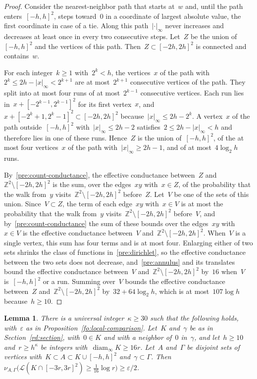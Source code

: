 \documentclass[11pt]{amsart}
\numberwithin{equation}{section}
\newtheorem{lemma}[equation]{Lemma}
\newcommand{\Z}{\mathbb Z}
\newcommand{\cL}{\mathscr{L}}
\DeclareMathOperator{\diam}{diam}
\begin{document}
\begin{proof}
Consider the nearest-neighbor path that starts at~$w$ and, until the path enters~$[-h,h]^2$, steps toward~$0$ in a coordinate of largest absolute value, the first coordinate in case of a tie. Along this path~$|\cdot|_\infty$ never increases and decreases at least once in every two consecutive steps. Let~$Z$ be the union of~$[-h,h]^2$ and the vertices of this path. Then~$Z\subset [-2h,2h]^2$ is connected and contains~$w$.

For each integer~$k\geq1$ with~$2^k<h$, the vertices~$x$ of the path with~$2^k\leq2h-|x|_\infty<2^{k+1}$ are at most~$2^{k+1}$ consecutive vertices of the path. They split into at most four runs of at most~$2^{k-1}$ consecutive vertices. Each run lies in~$x+[-2^{k-1},2^{k-1}]^2$ for its first vertex~$x$, and~$x+[-2^k+1,2^k-1]^2\subset [-2h,2h]^2$ because~$|x|_\infty\leq2h-2^k$. A vertex~$x$ of the path outside~$[-h,h]^2$ with~$|x|_\infty\leq2h-2$ satisfies~$2\leq2h-|x|_\infty<h$ and therefore lies in one of these runs. Hence~$Z$ is the union of~$[-h,h]^2$, of the at most four vertices~$x$ of the path with~$|x|_\infty\geq2h-1$, and of at most~$4\log_2h$ runs.

By~\eqref{pre:count-conductance}, the effective conductance between~$Z$ and~$\Z^2\setminus [-2h,2h]^2$ is the sum, over the edges~$xy$ with~$x\in Z$, of the probability that the walk from~$y$ visits~$\Z^2\setminus [-2h,2h]^2$ before~$Z$. Let~$V$ be one of the sets of this union. Since~$V\subset Z$, the term of each edge~$xy$ with~$x\in V$ is at most the probability that the walk from~$y$ visits~$\Z^2\setminus [-2h,2h]^2$ before~$V$, and by~\eqref{pre:count-conductance} the sum of these bounds over the edges~$xy$ with~$x\in V$ is the effective conductance between~$V$ and~$\Z^2\setminus [-2h,2h]^2$. When~$V$ is a single vertex, this sum has four terms and is at most four. Enlarging either of two sets shrinks the class of functions in~\eqref{pre:dirichlet}, so the effective conductance between the two sets does not decrease, and~\eqref{pre:annulus} and its translates bound the effective conductance between~$V$ and~$\Z^2\setminus [-2h,2h]^2$ by~$16$ when~$V$ is~$[-h,h]^2$ or a run. Summing over~$V$ bounds the effective conductance between~$Z$ and~$\Z^2\setminus [-2h,2h]^2$ by~$32+64\log_2h$, which is at most~$107\log h$ because~$h\geq10$.
\end{proof}

\begin{lemma}\label{ct:revealed-roots}
There is a universal integer~$\kappa\geq30$ such that the following holds, with~$\varepsilon$ as in Proposition~\ref{fo:local-comparison}. Let~$K$ and~$\gamma$ be as in Section~\ref{rd:section}, with~$0\in K$ and with a neighbor of~$0$ in~$\gamma$, and let~$h\geq10$ and~$r\geq h^\kappa$ be integers with~$\diam_\infty K\geq16r$. Let~$A$ and~$\Gamma$ be disjoint sets of vertices with~$K\subset A\subset K\cup [-h,h]^2$ and~$\gamma\subset\Gamma$. Then~$\nu_{A,\Gamma}\bigl(\cL(K\cap [-3r,3r]^2)\geq\tfrac1{16}\log r\bigr)\geq\varepsilon/2$.
\end{lemma}
\end{document}
